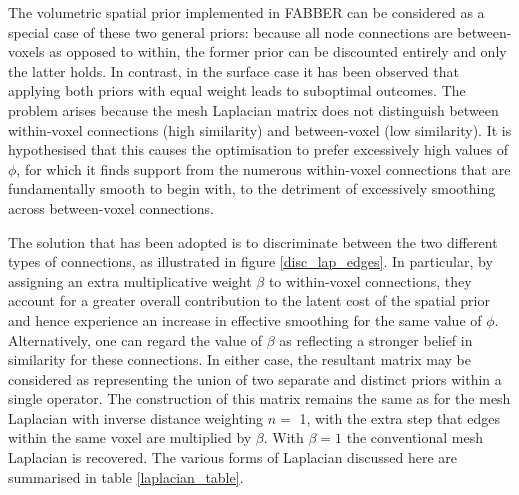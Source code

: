 \documentclass[12pt]{report}
\begin{document}
The volumetric spatial prior implemented in FABBER can be considered as a special case of these two general priors: because all node connections are between-voxels as opposed to within, the former prior can be discounted entirely and only the latter holds. In contrast, in the surface case it has been observed that applying both priors with equal weight leads to suboptimal outcomes. The problem arises because the mesh Laplacian matrix does not distinguish between within-voxel connections (high similarity) and between-voxel (low similarity). It is hypothesised that this causes the optimisation to prefer excessively high values of $\phi$, for which it finds support from the numerous within-voxel connections that are fundamentally smooth to begin with, to the detriment of excessively smoothing across between-voxel connections. 

The solution that has been adopted is to discriminate between the two different types of connections, as illustrated in figure \ref{disc_lap_edges}. In particular, by assigning an extra multiplicative weight $\beta$ to within-voxel connections, they account for a greater overall contribution to the latent cost of the spatial prior and hence experience an increase in effective smoothing for the same value of $\phi$. Alternatively, one can regard the value of $\beta$ as reflecting a stronger belief in similarity for these connections. In either case, the resultant matrix may be considered as representing the union of two separate and distinct priors within a single operator. The construction of this matrix remains the same as for the mesh Laplacian with inverse distance weighting $n =$ 1, with the extra step that edges within the same voxel are multiplied by $\beta$. With $\beta = 1$ the conventional mesh Laplacian is recovered. The various forms of Laplacian discussed here are summarised in table \ref{laplacian_table}. 
\end{document}

